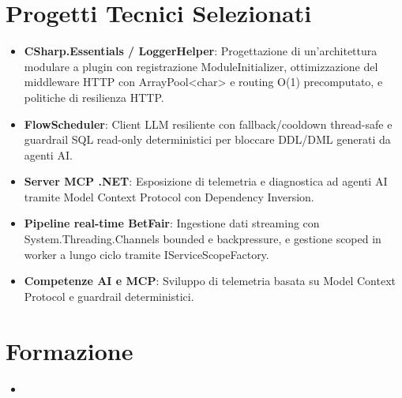 \documentclass[11pt,a4paper,sans]{moderncv}
\begin{document}
\section{Progetti Tecnici Selezionati}
\vspace{1pt}
\begin{itemize}

\item \textbf{CSharp.Essentials / LoggerHelper}: Progettazione di un'architettura modulare a plugin con registrazione ModuleInitializer, ottimizzazione del middleware HTTP con ArrayPool<char> e routing O(1) precomputato, e politiche di resilienza HTTP.

\item \textbf{FlowScheduler}: Client LLM resiliente con fallback/cooldown thread-safe e guardrail SQL read-only deterministici per bloccare DDL/DML generati da agenti AI.

\item \textbf{Server MCP .NET}: Esposizione di telemetria e diagnostica ad agenti AI tramite Model Context Protocol con Dependency Inversion.

\item \textbf{Pipeline real-time BetFair}: Ingestione dati streaming con System.Threading.Channels bounded e backpressure, e gestione scoped in worker a lungo ciclo tramite IServiceScopeFactory.

\item \textbf{Competenze AI e MCP}: Sviluppo di telemetria basata su Model Context Protocol e guardrail deterministici.

\end{itemize}


\section{Formazione}
\vspace{1pt}
\begin{itemize}

\item{}

\end{itemize}
\end{document}

